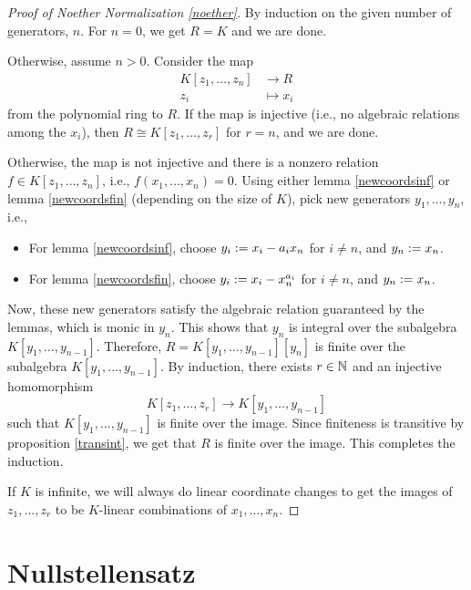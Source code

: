 \documentclass[12pt]{article}
\begin{document}
\begin{proof}[Proof of Noether Normalization \ref{noether}]
    By induction on the given number of generators, $n$. For $n=0$, we get $R=K$ and we are done. 
    
    Otherwise, assume $n>0$. Consider the map
    \begin{align*}
        K[z_1,\dots,z_n] &\longrightarrow R\\
        z_i &\longmapsto x_i
    \end{align*}
    from the polynomial ring to $R$. If the map is injective (i.e., no algebraic relations among the $x_i$), then $R\cong K[z_1,\dots,z_r]$ for $r=n$, and we are done.
    
    Otherwise, the map is not injective and there is a nonzero relation $f\in K[z_1,\dots,z_n]$, i.e., $f(x_1,\dots,x_n)=0$. Using either lemma \ref{newcoordsinf} or lemma \ref{newcoordsfin} (depending on the size of $K$), pick new generators $y_1,\dots,y_n$, i.e.,
    \begin{itemize}
        \item For lemma \ref{newcoordsinf}, choose $y_i := x_i - a_i x_n$ for $i\neq n$, and $y_n := x_n$.
        \item For lemma \ref{newcoordsfin}, choose $y_i := x_i - x_n^{a_i}$ for $i\neq n$, and $y_n := x_n$.
    \end{itemize}
    
    Now, these new generators satisfy the algebraic relation guaranteed by the lemmas, which is monic in $y_n$. This shows that $y_n$ is integral over the subalgebra $K[y_1,\dots,y_{n-1}]$. Therefore, $R=K[y_1,\dots,y_{n-1}][y_n]$ is finite over the subalgebra $K[y_1,\dots,y_{n-1}]$. By induction, there exists $r\in \mathbb{N}$ and an injective homomorphism
    \[K[z_1,\dots,z_r] \longrightarrow K[y_1,\dots,y_{n-1}]\]
    such that $K[y_1,\dots,y_{n-1}]$ is finite over the image. Since finiteness is transitive by proposition \ref{transint}, we get that $R$ is finite over the image. This completes the induction.
    
    If $K$ is infinite, we will always do linear coordinate changes to get the images of $z_1,\dots,z_r$ to be $K$-linear combinations of $x_1,\dots,x_n$.
\end{proof}

\section{Nullstellensatz}
\end{document}
